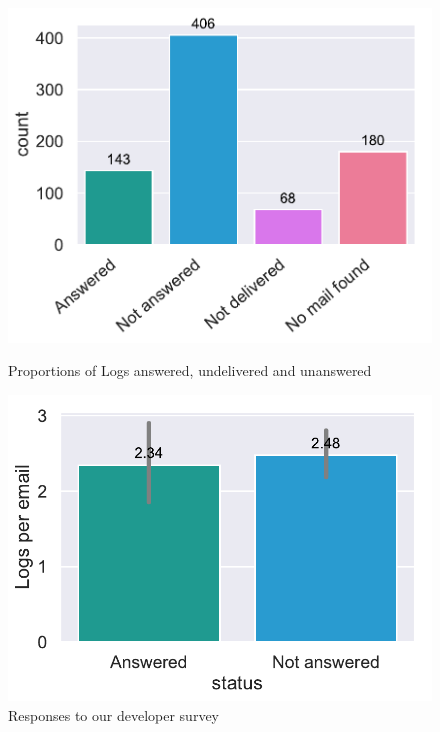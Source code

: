\documentclass[\myrootdir/main.tex]{subfiles}
\begin{document}
\begin{figure}[htbp]
	\centering
	\begin{minipage}{0.45\textwidth}
		\centering
		\includegraphics[width=\textwidth, clip]{img/dev-mails/answers-received-builds.pdf}
		\caption{Proportions of Logs answered, undelivered and unanswered}
		\label{fig:mails-answers-received-builds}
	\end{minipage}\hfill
	\begin{minipage}{0.45\textwidth}
		\centering
		\includegraphics[width=\textwidth, clip]{img/dev-mails/logs-per-mail.pdf}
		\caption{Responses to our developer survey}
		\label{fig:mails-logs-per-mail}
	\end{minipage}
\end{figure}
\end{document}
